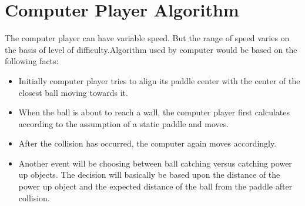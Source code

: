 \documentclass{article}
\begin{document}
\begin{itemize}


			\end{itemize}
			

			\section{Computer Player Algorithm}
			\par\noindent The computer player can have variable speed. But the range of speed varies on the basis of level of difficulty.Algorithm used by computer would be based on the following facts:

			\begin{itemize}
			\item Initially computer player tries to align its paddle center with the center of the closest ball moving towards it.
			\item When the ball is about to reach a wall, the computer player first calculates according to the assumption of a static paddle and moves.
			\item After the collision has occurred, the computer again moves accordingly.
			\item Another event will be choosing between ball catching versus catching power up objects. The decision will basically be based upon the distance of the power up object and the expected distance of the ball from the paddle after collision.
			\end{itemize}
\end{document}
